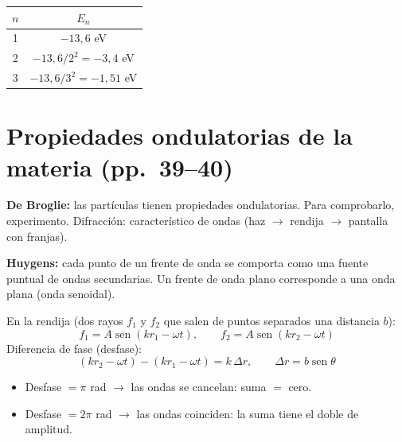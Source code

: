 \documentclass[11pt,a4paper]{article}
\newcommand{\pags}[1]{{\normalfont\small\color{gris}(pp.~#1)}}
\DeclareMathOperator{\sen}{sen}
\begin{document}
\begin{minipage}{0.45\textwidth}
\centering
\begin{tabular}{cc}
\toprule
$n$ & $E_n$\\
\midrule
1 & $-13{,}6$ eV\\
2 & $-13{,}6/2^2=-3{,}4$ eV\\
3 & $-13{,}6/3^2=-1{,}51$ eV\\
\bottomrule
\end{tabular}
\end{minipage}\hfill
\begin{minipage}{0.5\textwidth}
\centering
{}
\end{minipage}

\section{Propiedades ondulatorias de la materia \pags{39--40}}

\textbf{De Broglie:} las partículas tienen propiedades ondulatorias. Para comprobarlo, experimento.
Difracción: característico de ondas (haz $\rightarrow$ rendija $\rightarrow$ pantalla con franjas).

\textbf{Huygens:} cada punto de un frente de onda se comporta como una fuente puntual de ondas secundarias.
Un frente de onda plano corresponde a una onda plana (onda senoidal).

En la rendija (dos rayos $f_1$ y $f_2$ que salen de puntos separados una distancia $b$):
\[
f_1=A\sen(kr_1-\omega t),\qquad f_2=A\sen(kr_2-\omega t)
\]
Diferencia de fase (desfase):
\[
(kr_2-\omega t)-(kr_1-\omega t)=k\,\Delta r,\qquad \Delta r=b\sen\theta
\]
\begin{itemize}
  \item Desfase $=\pi$ rad $\rightarrow$ las ondas se cancelan: suma $=$ cero.
  \item Desfase $=2\pi$ rad $\rightarrow$ las ondas coinciden: la suma tiene el doble de amplitud.
\end{itemize}
\end{document}
